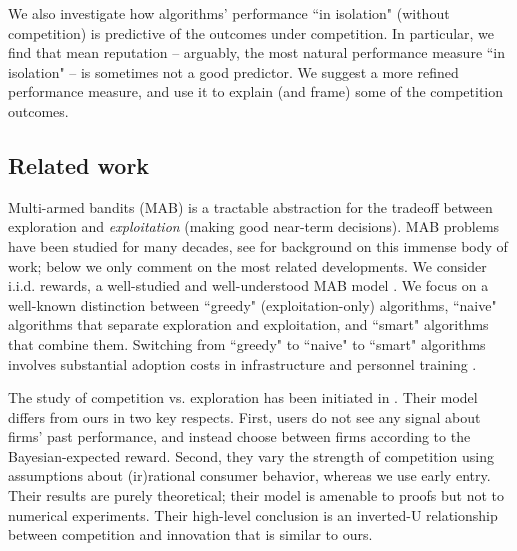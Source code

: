 \documentclass[../competing_bandits_with_appendix.tex]{subfiles}
\begin{document}

We also investigate how algorithms' performance ``in isolation" (without competition) is predictive of the outcomes under competition. In particular, we find that mean reputation -- arguably, the most natural performance measure ``in isolation" -- is sometimes not a good predictor. We suggest a more refined performance measure, and use it to explain (and frame) some of the competition outcomes.


\subsection{Related work}

 Multi-armed bandits (MAB) is a tractable abstraction for the tradeoff between exploration and \emph{exploitation} (making good near-term decisions). MAB problems have been studied for many decades, see \cite{Bubeck-survey12,LS19bandit-book} for background on this immense body of work; below we only comment on the most related developments. We consider i.i.d. rewards, a well-studied and well-understood MAB model \cite{bandits-ucb1}. We focus on a well-known distinction between ``greedy" (exploitation-only) algorithms, ``naive" algorithms that separate exploration and exploitation, and ``smart" algorithms that combine them. Switching from ``greedy" to ``naive" to ``smart" algorithms involves substantial adoption costs in infrastructure and personnel training \cite{MWT-WhitePaper-2016,DS-arxiv}. 

The study of competition vs. exploration has been initiated in \cite{CompetingBandits-itcs18}. Their model differs from ours in two key respects. First, users do not see any signal about firms' past performance, and instead choose between firms according to the Bayesian-expected reward. Second, they vary the strength of competition using assumptions about (ir)rational consumer behavior, whereas we use early entry. Their results are purely theoretical; their model is amenable to proofs but not to numerical experiments. Their high-level conclusion is an inverted-U relationship between competition and innovation that is similar to ours.
\end{document}
